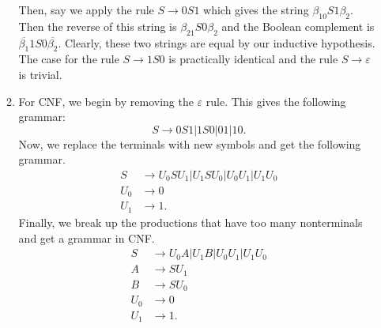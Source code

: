 \documentclass{article}
\renewcommand{\epsilon}{\varepsilon}
\theoremstyle{definition}
\begin{document}
\begin{enumerate}
\begin{enumerate}
		Then, say we apply the rule $S \to 0S1$ which gives the string $\beta_10S1\beta_2$. Then the reverse of this string is $\beta_21S0\beta_2$ and the Boolean complement is $\overline{\beta_1}1S0\overline{\beta_2}$. Clearly, these two strings are equal by our inductive hypothesis. The case for the rule $S \rightarrow 1S0$ is practically identical and the rule $S \rightarrow \epsilon$ is trivial. 
		\item For CNF, we begin by removing the $\epsilon$ rule. This gives the following grammar:
		\[S \rightarrow 0S1 | 1S0 | 01 | 10.\]
		Now, we replace the terminals with new symbols and get the following grammar.
		\begin{align*}
			S &\rightarrow U_0SU_1 | U_1SU_0 | U_0U_1 | U_1U_0 \\
			U_0 &\rightarrow 0 \\
			U_1 &\rightarrow 1.
		\end{align*}
		Finally, we break up the productions that have too many nonterminals and get a grammar in CNF.
		\begin{align*}
		S &\rightarrow U_0A | U_1B | U_0U_1 | U_1U_0 \\
		A &\rightarrow SU_1 \\
		B &\rightarrow SU_0 \\
		U_0 &\rightarrow 0 \\
		U_1 &\rightarrow 1.
		\end{align*}
		

\end{enumerate}
\end{enumerate}
\end{document}
